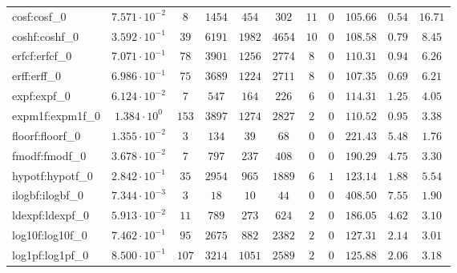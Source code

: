 \begin{tabular}{|l|c|c|c|c|c|c|c|c|c|c|}
cosf:cosf\_0                 & $ 7.571 \cdot 10^{-2} $ & $ 8      $ & $ 1454   $ & $ 454   $ & $ 302   $ & $ 11  $ & $ 0 $ & $ 105.66      $ & $ 0.54    $ & $ 16.71   $ \\
coshf:coshf\_0               & $ 3.592 \cdot 10^{-1} $ & $ 39     $ & $ 6191   $ & $ 1982  $ & $ 4654  $ & $ 10  $ & $ 0 $ & $ 108.58      $ & $ 0.79    $ & $ 8.45    $ \\
erfcf:erfcf\_0               & $ 7.071 \cdot 10^{-1} $ & $ 78     $ & $ 3901   $ & $ 1256  $ & $ 2774  $ & $ 8   $ & $ 0 $ & $ 110.31      $ & $ 0.94    $ & $ 6.26    $ \\
erff:erff\_0                 & $ 6.986 \cdot 10^{-1} $ & $ 75     $ & $ 3689   $ & $ 1224  $ & $ 2711  $ & $ 8   $ & $ 0 $ & $ 107.35      $ & $ 0.69    $ & $ 6.21    $ \\
expf:expf\_0                 & $ 6.124 \cdot 10^{-2} $ & $ 7      $ & $ 547    $ & $ 164   $ & $ 226   $ & $ 6   $ & $ 0 $ & $ 114.31      $ & $ 1.25    $ & $ 4.05    $ \\
expm1f:expm1f\_0             & $ 1.384 \cdot 10^{0}  $ & $ 153    $ & $ 3897   $ & $ 1274  $ & $ 2827  $ & $ 2   $ & $ 0 $ & $ 110.52      $ & $ 0.95    $ & $ 3.38    $ \\
floorf:floorf\_0             & $ 1.355 \cdot 10^{-2} $ & $ 3      $ & $ 134    $ & $ 39    $ & $ 68    $ & $ 0   $ & $ 0 $ & $ 221.43      $ & $ 5.48    $ & $ 1.76    $ \\
fmodf:fmodf\_0               & $ 3.678 \cdot 10^{-2} $ & $ 7      $ & $ 797    $ & $ 237   $ & $ 408   $ & $ 0   $ & $ 0 $ & $ 190.29      $ & $ 4.75    $ & $ 3.30    $ \\
hypotf:hypotf\_0             & $ 2.842 \cdot 10^{-1} $ & $ 35     $ & $ 2954   $ & $ 965   $ & $ 1889  $ & $ 6   $ & $ 1 $ & $ 123.14      $ & $ 1.88    $ & $ 5.54    $ \\
ilogbf:ilogbf\_0             & $ 7.344 \cdot 10^{-3} $ & $ 3      $ & $ 18     $ & $ 10    $ & $ 44    $ & $ 0   $ & $ 0 $ & $ 408.50      $ & $ 7.55    $ & $ 1.90    $ \\
ldexpf:ldexpf\_0             & $ 5.913 \cdot 10^{-2} $ & $ 11     $ & $ 789    $ & $ 273   $ & $ 624   $ & $ 2   $ & $ 0 $ & $ 186.05      $ & $ 4.62    $ & $ 3.10    $ \\
log10f:log10f\_0             & $ 7.462 \cdot 10^{-1} $ & $ 95     $ & $ 2675   $ & $ 882   $ & $ 2382  $ & $ 2   $ & $ 0 $ & $ 127.31      $ & $ 2.14    $ & $ 3.01    $ \\
log1pf:log1pf\_0             & $ 8.500 \cdot 10^{-1} $ & $ 107    $ & $ 3214   $ & $ 1051  $ & $ 2589  $ & $ 2   $ & $ 0 $ & $ 125.88      $ & $ 2.06    $ & $ 3.18    $ \\

\end{tabular}
